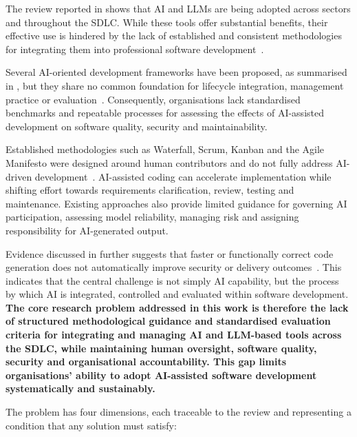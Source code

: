 \label{chap:problem}
\label{sec:problem}

The review reported in  shows that \ac{AI} and \acp{LLM} are being adopted across sectors and throughout the \ac{SDLC}. While these tools offer substantial benefits, their effective use is hindered by the lack of established and consistent methodologies for integrating them into professional software development~\cite{Banh:2025cf, Farhanna:2025eu, Hemmat:2025rd, Gao:2025cc}.

Several AI-oriented development frameworks have been proposed, as summarised in , but they share no common foundation for lifecycle integration, management practice or evaluation~\cite{Ahmed:2025ai}. Consequently, organisations lack standardised benchmarks and repeatable processes for assessing the effects of AI-assisted development on software quality, security and maintainability.

Established methodologies such as Waterfall, Scrum, Kanban and the Agile Manifesto were designed around human contributors and do not fully address AI-driven development~\cite{Zhang:2025ea}. AI-assisted coding can accelerate implementation while shifting effort towards requirements clarification, review, testing and maintenance. Existing approaches also provide limited guidance for governing AI participation, assessing model reliability, managing risk and assigning responsibility for AI-generated output.

Evidence discussed in  further suggests that faster or functionally correct code generation does not automatically improve security or delivery outcomes~\cite{Veracode:2025gen, Faros:2025par}. This indicates that the central challenge is not simply AI capability, but the process by which AI is integrated, controlled and evaluated within software development. \textbf{The core research problem addressed in this work is therefore the lack of structured methodological guidance and standardised evaluation criteria for integrating and managing \ac{AI} and \ac{LLM}-based tools across the \ac{SDLC}, while maintaining human oversight, software quality, security and organisational accountability. This gap limits organisations' ability to adopt AI-assisted software development systematically and sustainably.}

The problem has four dimensions, each traceable to the review and representing a condition that any solution must satisfy:


